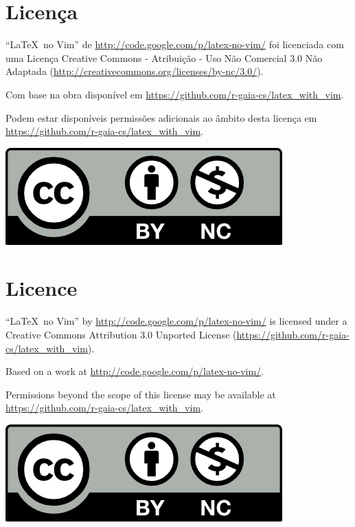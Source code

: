 % 
% 
% 
% 
% 
\section*{Licen\c{c}a}

``\LaTeX\ no Vim'' de \url{http://code.google.com/p/latex-no-vim/} foi licenciada com uma Licen\c{c}a Creative Commons - Atribui\c{c}\~{a}o - Uso N\~{a}o Comercial 3.0 N\~{a}o Adaptada (\url{http://creativecommons.org/licenses/by-nc/3.0/}). 

Com base na obra dispon\'{i}vel em \url{https://github.com/r-gaia-cs/latex_with_vim}. 

Podem estar dispon\'{i}veis permiss\~{o}es adicionais ao \^{a}mbito desta licen\c{c}a em \url{https://github.com/r-gaia-cs/latex_with_vim}.

\begin{center}
    \includegraphics[keepaspectratio=true]{../../figures/by_nc.png}
\end{center}

\section*{Licence}

``\LaTeX\ no Vim'' by \url{http://code.google.com/p/latex-no-vim/} is licensed under a Creative Commons Attribution 3.0 Unported License (\url{https://github.com/r-gaia-cs/latex_with_vim}).

Based on a work at \url{http://code.google.com/p/latex-no-vim/}.

Permissions beyond the scope of this license may be available at \url{https://github.com/r-gaia-cs/latex_with_vim}.

\begin{center}
    \includegraphics[keepaspectratio=true]{../../figures/by_nc.png}
\end{center}
